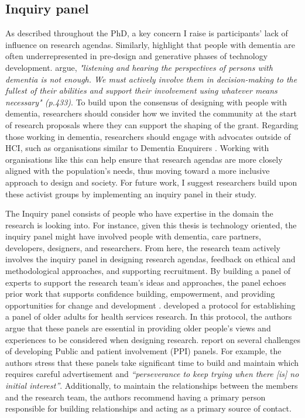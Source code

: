 \subsection{Inquiry panel}
\label{Inquiry Panel}
As described throughout the PhD, a key concern I raise is participants' lack of influence on research agendas. Similarly, \cite{suijkerbuijk_active_2019} highlight that people with dementia are often underrepresented in pre-design and generative phases of technology development. \cite{dupuis_moving_2012} argue, \textit{"listening and hearing the perspectives of persons with dementia is not enough. We must actively involve them in decision-making to the fullest of their abilities and support their involvement using whatever means necessary" (p.433)}. To build upon the consensus of designing with people with dementia, researchers should consider how we invited the community at the start of research proposals where they can support the shaping of the grant. Regarding those working in dementia, researchers should engage with advocates outside of HCI, such as organisations similar to Dementia Enquirers \citep{davies2021dementia}. Working with organisations like this can help ensure that research agendas are more closely aligned with the population's needs, thus moving toward a more inclusive approach to design and society. For future work, I suggest researchers build upon these activist groups by implementing an inquiry panel in their study.

The Inquiry panel consists of people who have expertise in the domain the research is looking into. For instance, given this thesis is technology oriented, the inquiry panel might have involved people with dementia, care partners, developers, designers, and researchers. From here, the research team actively involves the inquiry panel in designing research agendas, feedback on ethical and methodological approaches, and supporting recruitment. By building a panel of experts to support the research team’s ideas and approaches, the panel echoes prior work that supports confidence building, empowerment, and providing opportunities for change and development \citep{reuter_older_2019}. \cite{conneely2020protocol} developed a protocol for establishing a panel of older adults for health services research. In this protocol, the authors argue that these panels are essential in providing older people's views and experiences to be considered when designing research. \cite{grier2018finding} report on several challenges of developing Public and patient involvement (PPI) panels. For example, the authors stress that these panels take significant time to build and maintain which requires careful advertisement and \textit{``perseverance to keep trying when there [is] no initial interest''}. Additionally, to maintain the relationships between the members and the research team, the authors recommend having a primary person responsible for building relationships and acting as a primary source of contact. 

